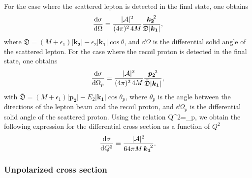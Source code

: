 For the case where the scattered lepton is detected in the final state, one obtains 
\begin{equation}
\frac{\mathrm{d}\sigma}{\mathrm{d}\Omega}=\frac{\vert {\mathcal A} \vert^2}{(4\pi)^2 \,4M}\frac{\boldsymbol{k_2}^{\!2}}{\mathfrak{D}\vert\boldsymbol{ k_1}\vert},
\label{eq:eq11}
\end{equation}
where $\mathfrak{D}=(M+\epsilon_1)\vert\boldsymbol{ k_2}\vert-\epsilon_2\vert\boldsymbol{ k_1}\vert\cos\theta $, and $\dd \Omega$ is the differential solid angle of the scattered lepton. For the case where the recoil proton
is detected in the final state, one obtains
\begin{equation}
\frac{\mathrm{d}\sigma}{\mathrm{d}\Omega_p}=\frac{\vert{{\mathcal A}}\vert^2}{(4\pi)^2\,4M}\frac{\boldsymbol{p_2}^{\!2}}{\bar{ \mathfrak{D}}\vert\boldsymbol{ k_1}\vert},
\label{eq:eq13}
\end{equation}
with $\bar{ \mathfrak{D}}=(M+\epsilon_1)\vert\boldsymbol{ p_2}\vert-E_2\vert\boldsymbol{ k_1}\vert\cos\theta_p $, where $\theta_p $  is the angle between the directions 
of the lepton beam and the recoil proton, and $\dd \Omega_p$ is the differential solid angle of the scattered proton. Using the relation
\beq
\dd Q^2=\vert{}\vert \vert{}\vert{}\dd\Omega_p, 
\eeq
we obtain the following expression for the differential cross section as a function of $Q^2$
\begin{equation}
\frac{\mathrm{d}\sigma}{\mathrm{d} Q^2}=\frac{\vert {\mathcal A}\vert^2}{64\pi M\,\boldsymbol{k_1}^{\!2}}.
\label{eq:eq14}
\end{equation}



\subsubsection{Unpolarized cross section}




